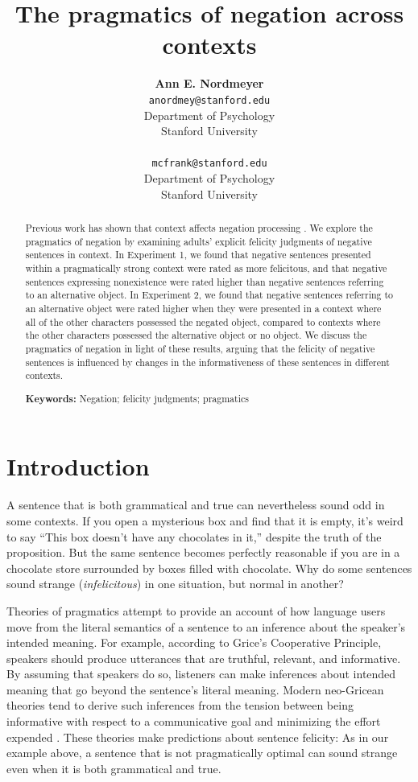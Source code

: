 \documentclass[10pt,letterpaper]{article}
\title{The pragmatics of negation across contexts}
\author{{\large \bf Ann E. Nordmeyer} \\ \texttt{anordmey@stanford.edu}\\ Department of Psychology \\ Stanford University \\ 
\And {\large \bf Michael C. Frank} \\ \texttt{mcfrank@stanford.edu} \\ Department of Psychology \\ Stanford University \\ }
\begin{document}
\maketitle


\begin{abstract}
Previous work  has shown that context affects negation processing \cite{wason1965, nordmeyer2014}. We explore the pragmatics of negation by examining adults' explicit felicity judgments of negative sentences in context.  In Experiment 1, we found that negative sentences presented within a pragmatically strong context were rated as more felicitous, and that negative sentences expressing nonexistence were rated higher than negative sentences referring to an alternative object.  In Experiment 2, we found that negative sentences referring to an alternative object were rated higher when they were presented in a context where all of the other characters possessed the negated object, compared to contexts where the other characters possessed the alternative object or no object.  We discuss the pragmatics of negation in light of these results, arguing that the felicity of negative sentences is influenced by changes in the informativeness of these sentences in different contexts. 

\textbf{Keywords:} 
Negation; felicity judgments; pragmatics
\end{abstract}

\section{Introduction}

A sentence that is both grammatical and true can nevertheless sound odd in some contexts. If you open a mysterious box and find that it is empty, it's weird to say ``This box doesn't have any chocolates in it,'' despite the truth of the proposition. But the same sentence becomes perfectly reasonable if you are in a chocolate store surrounded by boxes filled with chocolate.  Why do some sentences sound strange (\emph{infelicitous}) in one situation, but normal in another?

Theories of pragmatics attempt to provide an account of how language users move from the literal semantics of a sentence to an inference about the speaker's intended meaning. For example, according to Grice's \citeyear{grice1975} Cooperative Principle, speakers should produce utterances that are truthful, relevant, and informative.  By assuming that speakers do so, listeners can make inferences about intended meaning that go beyond the sentence's literal meaning. Modern neo-Gricean theories tend to derive such inferences from the tension between being informative with respect to a communicative goal and minimizing the effort expended \cite{horn1984,levinson2000,frank2012}. These theories make predictions about sentence felicity: As in our example above, a sentence that is not pragmatically optimal can sound strange even when it is both grammatical and true.
\end{document}
